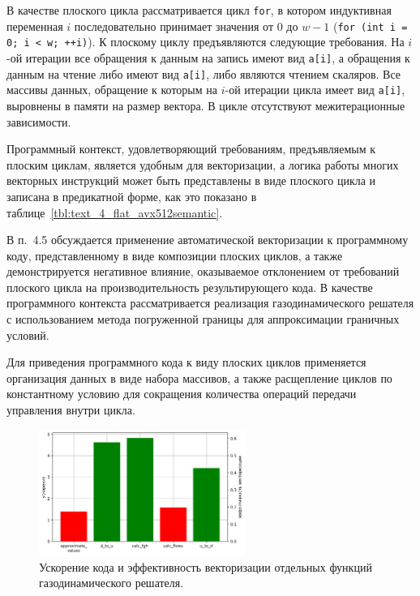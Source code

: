 \documentclass[a4paper,14pt]{extarticle}                     %
\theoremstyle{plain}                                         %
\begin{document}
В качестве плоского цикла рассматривается цикл \texttt{for}, в котором индуктивная переменная $i$ последовательно принимает значения от $0$ до $w - 1$ (\texttt{for (int i = 0; i < w; ++i)}).
К плоскому циклу предъявляются следующие требования.
На $i$-ой итерации все обращения к данным на запись имеют вид \texttt{a[i]}, а обращения к данным на чтение либо имеют вид \texttt{a[i]}, либо являются чтением скаляров.
Все массивы данных, обращение к которым на $i$-ой итерации цикла имеет вид \texttt{a[i]}, выровнены в памяти на размер вектора.
В цикле отсутствуют межитерационные зависимости.

Программный контекст, удовлетворяющий требованиям, предъявляемым к плоским циклам, является удобным для векторизации, а логика работы многих векторных инструкций может быть представлены в виде плоского цикла и записана в предикатной форме, как это показано в таблице~\ref{tbl:text_4_flat_avx512semantic}.


В п.~4.5 обсуждается применение автоматической векторизации к программному коду, представленному в виде композиции плоских циклов, а также демонстрируется негативное влияние, оказываемое отклонением от требований плоского цикла на производительность результирующего кода.
В качестве программного контекста рассматривается реализация газодинамического решателя с использованием метода погруженной границы для аппроксимации граничных условий.

Для приведения программного кода к виду плоских циклов применяется организация данных в виде набора массивов, а также расщепление циклов по константному условию для сокращения количества операций передачи управления внутри цикла.

\begin{figure}[ht]
\centering
\includegraphics[width=0.6\textwidth]{./pics/text_4_ibm/diagr2.png}
\singlespacing
{}\caption{Ускорение кода и эффективность векторизации отдельных функций газодинамического решателя.}
\label{fig:text_4_ibm_diagr2}
\end{figure}
\end{document}
